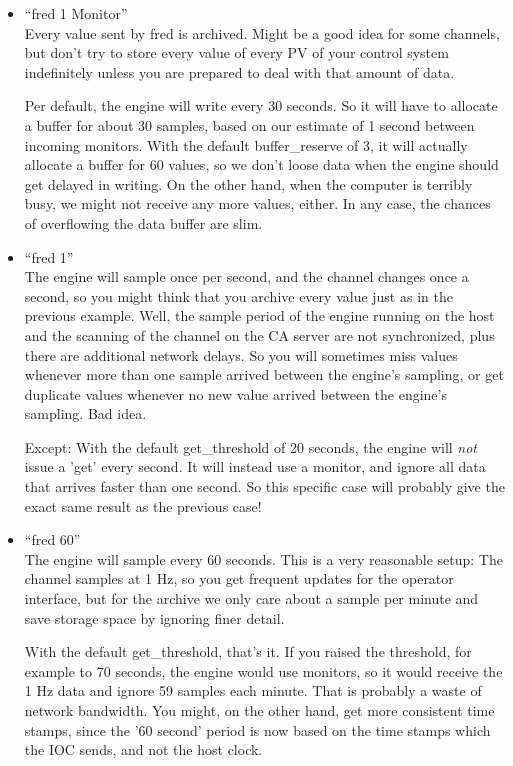 \begin{itemize}
\item ``fred 1 Monitor''\\
      Every value sent by fred is archived. Might be a good idea for
      some channels, but don't try to store every value of every PV
      of your control system indefinitely unless you are prepared to
      deal with that amount of data.

      Per default, the engine will write every 30 seconds. So it will
      have to allocate a buffer for about 30 samples, based on our
      estimate of 1 second between incoming monitors.
      With the default buffer\_reserve of 3, it will actually allocate
      a buffer for 60 values, so we don't loose data when the engine
      should get delayed in writing. On the other hand, when the
      computer is terribly busy, we might not receive any more values,
      either. In any case, the chances of overflowing the data buffer
      are slim.
\item ``fred 1''\\
      The engine will sample once per second, and the channel changes
      once a second, so you might think that you archive every value
      just as in the previous example.  Well, the sample period of the
      engine running on the host and the scanning of the channel on
      the CA server are not synchronized, plus there are additional
      network delays. So you will sometimes miss values whenever more
      than one sample arrived between the engine's sampling, or get
      duplicate values whenever no new value arrived between the
      engine's sampling. Bad idea.

      Except: With the default get\_threshold of 20 seconds, the engine
      will \emph{not} issue a 'get' every second. It will instead use a
      monitor, and ignore all data that arrives faster than one
      second. So this specific case will probably give the exact same result
      as the previous case!
\item ``fred 60''\\
      The engine will sample every 60 seconds. This is a very
      reasonable setup: The channel samples at 1 Hz, so you get
      frequent updates for the operator interface, but for the archive
      we only care about a sample per minute and save storage space by
      ignoring finer detail.

      With the default get\_threshold, that's it. If you raised the
      threshold, for example to 70 seconds, the engine would use
      monitors, so it would receive the 1 Hz data and ignore 59
      samples each minute. That is probably a waste of network
      bandwidth. You might, on the other hand, get more consistent
      time stamps, since the '60 second' period is now based on the
      time stamps which the IOC sends, and not the host clock.


\end{itemize}
